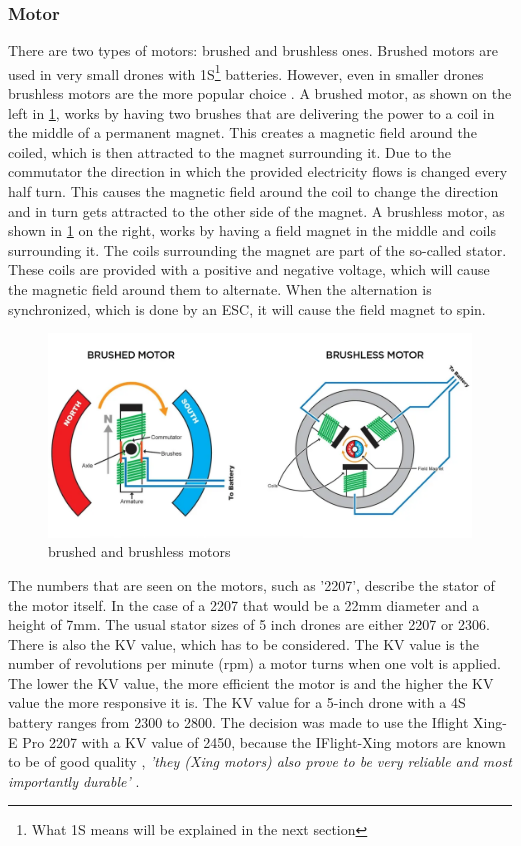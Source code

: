 \documentclass[svgnames]{article}
\begin{document}
	\subsubsection{Motor}
	There are two types of motors: brushed and brushless ones. Brushed motors are used in very small drones with 1S\footnote{What 1S means will be explained in the next section} batteries. However, even in smaller drones brushless motors are the more popular choice \cite{brush/lessmotors}. A brushed motor, as shown on the left in \cref{fig:brushedbrushlessmotor}, works by having two brushes that are delivering the power to a coil in the middle of a permanent magnet. This creates a magnetic field around the coiled, which is then attracted to the magnet surrounding it. Due to the commutator the direction in which the provided electricity flows is changed every half turn. This causes the magnetic field around the coil to change the direction and in turn gets attracted to the other side of the magnet. A brushless motor, as shown in \cref{fig:brushedbrushlessmotor} on the right, works by having a field magnet in the middle and coils surrounding it. The coils surrounding the magnet are part of the so-called stator. These coils are provided with a positive and negative voltage, which will cause the magnetic field around them to alternate. When the alternation is synchronized, which is done by an \gls{ESC}, it will cause the field magnet to spin. 
\begin{figure}[ht]
	\includegraphics[width=0.9\columnwidth]{pictures/brushed_brushlessmotor}
	\caption{brushed and brushless motors \cite{brushlessedmotor}}
	\label{fig:brushedbrushlessmotor}
\end{figure}

	The numbers that are seen on the motors, such as '2207', describe the stator of the motor itself. In the case of a 2207 that would be a 22mm diameter and a height of 7mm. The usual stator sizes of 5 inch drones are either 2207 or 2306. There is also the KV value, which has to be considered. The KV value is the number of revolutions per minute (rpm) a motor turns when one volt is applied. The lower the KV value, the more efficient the motor is and the higher the KV value the more responsive it is. The KV value for a 5-inch drone with a 4S battery ranges from 2300 to 2800. The decision was made to use the Iflight Xing-E Pro 2207  with a KV value of 2450, because the IFlight-Xing motors are known to be of good quality \cite{xingepro}, \textit{'they (Xing motors) also prove to be very reliable and most importantly durable'} \textcite{xingreview}. 
\end{document}
